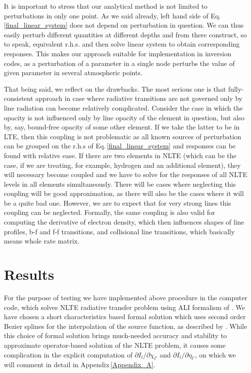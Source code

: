 \documentclass[referee]{aa}
\begin{document}
It is important to stress that our analytical method is not limited to perturbations in only one point. As we said already, left hand side of Eq.\,\ref{final_linear_system} does not depend on perturbation in question. We can thus easily perturb different quantities at different depths and from there construct, so to speak, equivalent r.h.s. and then solve linear system to obtain corresponding responses. This makes our approach suitable for implementation in inversion codes, as a perturbation of a parameter in a single node perturbs the value of given parameter in several atmospheric points.

That being said, we reflect on the drawbacks. The most serious one is that fully-consistent approach in case where radiative transitions are not governed only by line radiation can become relatively complicated. Consider the case in which the opacity is not influenced only by line opacity of the element in question, but also by, say, bound-free opacity of some other element. If we take the latter to be in LTE, then this coupling is not problematic as all known sources of perturbation can be grouped on the r.h.s of Eq.\,\ref{final_linear_system} and responses can be found with relative ease. If there are two elements in NLTE (which can be the case, if we are treating, for example, hydrogen and an additional element), they will necessary become coupled and we have to solve for the responses of all NLTE levels in all elements simultaneously. There will be cases where neglecting this coupling will be good approximation, as there will also be the cases where it will be a quite bad one. However, we are to expect that for very strong lines this coupling can be neglected. Formally, the same coupling is also valid for computing the derivative of electron density, which then influences shapes of line profiles, b-f and f-f transitions, and collisional line transitions, which basically means whole rate matrix.   

\section{Results}

For the purpose of testing we have implemented above procedure in the computer code, which solves NLTE radiative transfer problem using ALI formalism of \citet{RH1}. We have chosen a short characteristics based formal solution which uses second order Bezier splines for the interpolation of the source function, as described by \citet{JaimeBezier}. While this choice of formal solution brings much-needed accuracy and stability to approximate operator-based solution of the NLTE problem, it causes some complication in the explicit computation of $\partial I_l/\partial \chi_{l'}$ and $\partial I_l/\partial \eta_{l'}$, on which we will comment in detail in Appendix\,\ref{Appendix_A}.
\end{document}
